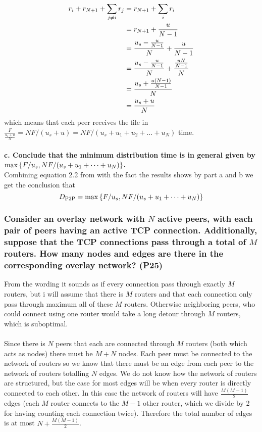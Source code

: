 \begin{equation*}
\begin{split}
    r_i + r_{N + 1} + \sum_{j \neq i} r_j &= r_{N+1} + \sum_i r_i \\
    &= r_{N+1} + \frac{u}{N - 1} \\
    &= \frac{u_s - \frac{u}{N-1}}{N} + \frac{u}{N - 1} \\
    &= \frac{u_s - \frac{u}{N-1}}{N} + \frac{\frac{uN}{N - 1}}{N} \\
    &= \frac{u_s + \frac{u \left (N - 1\right)}{N - 1}}{N} \\
    &= \frac{u_s + u}{N} 
\end{split}
\end{equation*}
which means that each peer receives the file in $\frac{F}{\frac{u_s + u}{N}} = NF/(u_s + u) = NF/(u_s + u_1 + u_2 + \dots + u_N)$ time. \\
\\
\textbf{c. Conclude that the minimum distribution time is in general given by \\ $\max \left \{F/u_s, NF/(u_s + u_1 + \dots + u_N)\right\}$.} \\
Combining equation 2.2 from \cite{kr} with the fact the results shows by part a and b we get the conclusion that 
\begin{equation*}
    D_{\text{P2P}} = \max \left \{F/u_s, NF/(u_s + u_1 + \dots + u_N)\right\}
\end{equation*}


\subsubsection{Consider an overlay network with $N$ active peers, with each pair of peers having an active TCP connection. Additionally, suppose that the TCP connections pass through a total of $M$ routers. How many nodes and edges are there in the corresponding overlay network? (P25)}


From the wording it sounds as if every connection pass through exactly $M$ routers, but i will assume that there is $M$ routers and that each connection only pass through maximum all of these $M$ routers. Otherwise neighboring peers, who could connect using one router would take a long detour through $M$ routers, which is suboptimal. \\
\\
Since there is $N$ peers that each are connected through $M$ routers (both which acts as nodes) there must be $M+N$ nodes. Each peer must be connected to the network of routers so we know that there must be an edge from each peer to the network of routers totalling $N$ edges. We do not know how the network of routers are structured, but the case for most edges will be when every router is directly connected to each other. In this case the network of routers will have $\frac{M(M-1)}{2}$ edges (each $M$ router connects to the $M-1$ other router, which we divide by 2 for having counting each connection twice). Therefore the total number of edges is at most $N + \frac{M(M-1)}{2}$.


